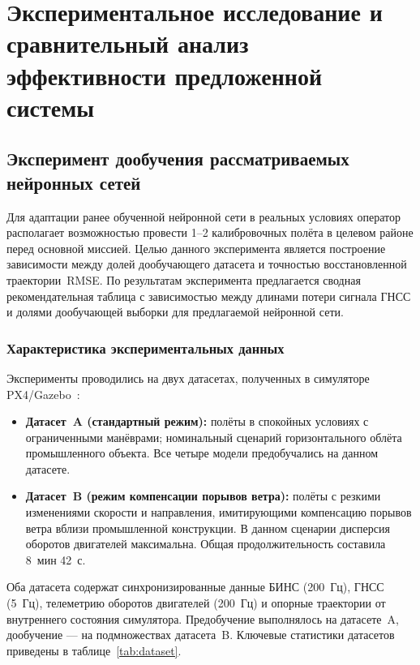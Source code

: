 \chapter{Экспериментальное исследование и сравнительный анализ эффективности предложенной системы}
\label{ch:4}

	\section{Эксперимент дообучения рассматриваемых нейронных сетей}
\label{sec:experement}

Для адаптации ранее обученной нейронной сети в реальных условиях оператор
располагает возможностью провести 1--2 калибровочных полёта в целевом районе
перед основной миссией.
Целью данного эксперимента является построение зависимости между долей
дообучающего датасета и точностью восстановленной траектории~RMSE.
По результатам эксперимента предлагается сводная рекомендательная таблица
с зависимостью между длинами потери сигнала ГНСС и долями дообучающей выборки
для предлагаемой нейронной сети.

\subsection{Характеристика экспериментальных данных}
\label{sec:datasets}

Эксперименты проводились на двух датасетах, полученных в симуляторе
PX4/Gazebo~\cite{Burri2016}:
\begin{itemize}
	\item \textbf{Датасет~A (стандартный режим):} полёты в спокойных условиях
	с ограниченными манёврами; номинальный сценарий горизонтального облёта
	промышленного объекта. Все четыре модели предобучались на данном датасете.
	\item \textbf{Датасет~B (режим компенсации порывов ветра):} полёты с резкими
	изменениями скорости и направления, имитирующими компенсацию порывов ветра
	вблизи промышленной конструкции. В данном сценарии дисперсия оборотов
	двигателей максимальна. Общая продолжительность составила 8~мин 42~с.
\end{itemize}

Оба датасета содержат синхронизированные данные БИНС (200~Гц), ГНСС (5~Гц),
телеметрию оборотов двигателей (200~Гц) и опорные траектории от внутреннего
состояния симулятора.
Предобучение выполнялось на датасете~A, дообучение --- на подмножествах
датасета~B.
Ключевые статистики датасетов приведены в таблице~\ref{tab:dataset}.

